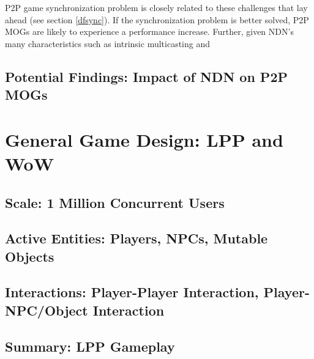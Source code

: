 \documentclass{article}
\begin{document}
P2P game synchronization problem is closely related to these challenges that lay ahead (see section \ref{dfsync}). If the synchronization problem is better solved, P2P MOGs are likely to experience a performance increase. Further, given NDN's many characteristics such as intrinsic multicasting and 

\subsection{Potential Findings: Impact of NDN on P2P MOGs}


\section{General Game Design: LPP and WoW}
\label{ggd}

\subsection{Scale: 1 Million Concurrent Users}

\subsection{Active Entities: Players, NPCs, Mutable Objects}

\subsection{Interactions: Player-Player Interaction, Player-NPC/Object Interaction}

\subsection{Summary: LPP Gameplay}

\end{document}
